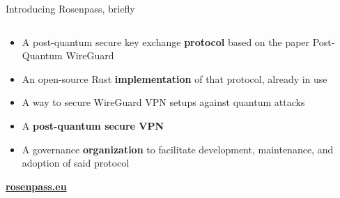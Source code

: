 \begin{frame}{Introducing Rosenpass, briefly}
  \begin{columns}[fullwidth,c]

    \begin{column}{.5\linewidth}
      \begin{itemize}
        \item A post-quantum secure key exchange \textbf{protocol}
          {\small based on the paper Post-Quantum WireGuard~\citePqwg}
        \item An open-source Rust \textbf{implementation} of that protocol, already in use
        \item A way to secure WireGuard VPN setups against quantum attacks
        \item A \textbf{post-quantum secure VPN}
        \item A governance \textbf{organization} to facilitate development, maintenance, and adoption of said protocol
      \end{itemize}
      \bigskip
      \textbf{\url{rosenpass.eu}}
    \end{column}%
  \end{columns}
\end{frame}
